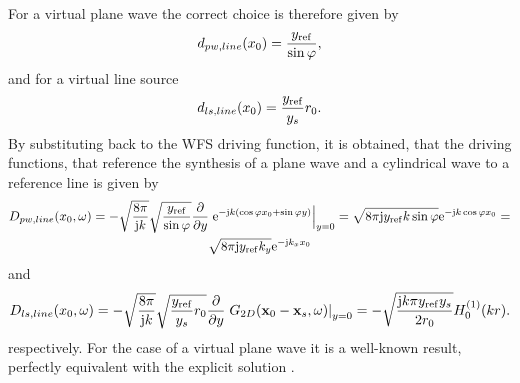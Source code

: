 For a virtual plane wave the correct choice is therefore given by
\begin{equation}
d_{pw,line}(x_0) = \frac{y_{\mathrm{ref}}}{\sin\varphi},
\end{equation}
and for a virtual line source 
\begin{equation}
d_{ls,line}(x_0) = \frac{y_{\mathrm{ref}}}{y_s} r_0.
\end{equation}
By substituting back to the WFS driving function, it is obtained, that the driving functions, that reference the synthesis of a plane wave and a cylindrical wave to a reference line is given by
\begin{multline}
D_{pw,line}(x_0,\omega) = 
- \sqrt{\frac{8\pi}{\mathrm{j} k}}\sqrt{\frac{y_{\mathrm{ref}}}{\sin\varphi}} \frac{\partial}{\partial y} \left. \mathrm{e}^{-\mathrm{j} k (\cos\varphi x_0 + \sin\varphi y)} \right|_{y = 0} = 
\sqrt{8\pi \mathrm{j} y_{\mathrm{ref}} k \sin\varphi}\mathrm{e}^{-\mathrm{j} k \cos\varphi x_0 } =\\ 
\sqrt{8\pi \mathrm{j} y_{\mathrm{ref}} k_y }\mathrm{e}^{-\mathrm{j} k_x x_0 }
\end{multline}
and
\begin{multline}
D_{ls,line}(x_0,\omega) = 
- \sqrt{\frac{8\pi}{\mathrm{j} k}}\sqrt{\frac{y_{\mathrm{ref}}}{y_s} r_0} \frac{\partial}{\partial y} \left. G_{2D}(\mathbf{x}_0 -  \mathbf{x}_s,\omega) \right|_{y = 0} =
- \sqrt{\frac{\mathrm{j} k \pi y_{\mathrm{ref}} y_s}{2 r_0}}  H_0^{(1)}( k r ).
\end{multline}
respectively. For the case of a virtual plane wave it is a well-known result, perfectly equivalent with the explicit solution \cite{Ahrens2012}.


